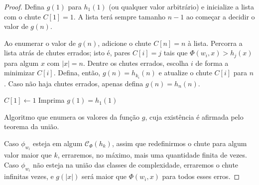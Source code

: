 \begin{proof}
    Defina $g(1)$ para $h_1(1)$
    (ou qualquer valor arbitrário)
    e inicialize a lista com o chute
    $C[1] = 1$.
    A lista terá sempre tamanho $n-1$
    ao começar a decidir o valor de $g(n)$.

    Ao enumerar o valor de $g(n)$,
    adicione o chute $C[n] = n$ à lista.
    Percorra a lista atrás de chutes errados;
    isto é,
    pares $C[i] = j$
    tais que $\Phi(w_i, x) > h_j(x)$
    para algum $x$ com $|x| = n$.
    Dentre os chutes errados,
    escolha $i$ de forma a minimizar $C[i]$.
    Defina, então, $g(n) = h_{k_i}(n)$
    e atualize o chute $C[i]$ para $n$.
    Caso não haja chutes errados,
    apenas defina $g(n) = h_n(n)$.

    \begin{algorithm}[h]
        $C[1] \leftarrow 1$ \;
        Imprima $g(1) = h_1(1)$ \;
        \caption{
            Algoritmo que enumera os valores da função $g$,
            cuja existência é afirmada pelo teorema da união.
        }
        \label{algo:union_theorem}
    \end{algorithm}

    Caso $\phi_{w_i}$ esteja em algum $\mathcal C_\Phi(h_k)$,
    assim que redefinirmos o chute para algum valor maior que $k$,
    erraremos, no máximo,
    mais uma quantidade finita de vezes.
    Caso $\phi_{w_i}$ não esteja na união das classes de complexidade,
    erraremos o chute infinitas vezes,
    e $g(|x|)$ será maior que $\Phi(w_i, x)$ para todos esses erros.


\end{proof}
